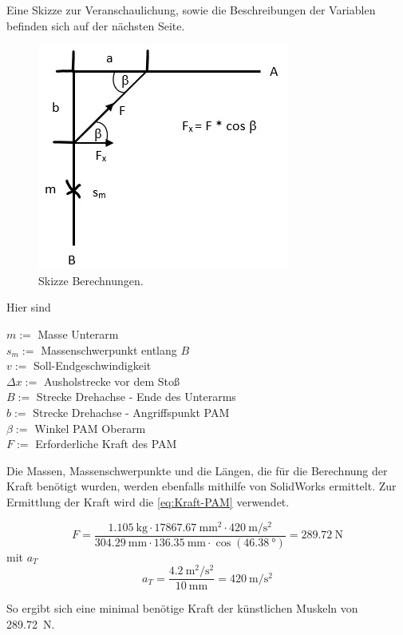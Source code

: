 		Eine Skizze zur Veranschaulichung, sowie die Beschreibungen der Variablen befinden sich auf der nächsten Seite. 

		\newpage
		\begin{figure}[h]
			\centering
			\includegraphics[width=.5\textwidth]{Abb/SkizzeBerechnungen.jpeg}
			\caption{Skizze Berechnungen.}%
			\label{fig:SkizzeBerechnungen}
		\end{figure}

		Hier sind

		\( m := \) Masse Unterarm \\
		\( s_m := \) Massenschwerpunkt entlang $ B $ \\
		\( v := \) Soll-Endgeschwindigkeit \\
		\( \Delta x := \) Ausholstrecke vor dem Stoß \\
		\( B := \) Strecke Drehachse - Ende des Unterarms \\
		\( b:= \) Strecke Drehachse - Angriffspunkt PAM \\
		\( \beta := \) Winkel PAM  Oberarm \\
		\( F:= \) Erforderliche Kraft des PAM

		Die Massen, Massenschwerpunkte und die Längen, die für die Berechnung der Kraft benötigt wurden, werden ebenfalls mithilfe von SolidWorks ermittelt. 
		Zur Ermittlung der Kraft wird die \cref{eq:Kraft-PAM} verwendet. 

		\begin{equation}
			F =\frac{\SI{1,105}{\kilogram} \cdot \SI{17867,67}{\milli\metre\squared} \cdot \SI{420}{\metre\per\second\squared}}{\SI{304,29}{\milli\metre} \cdot \SI{136,35}{\milli\metre} \cdot \cos{\left(\SI{46,38}{\degree}\right)}} = \SI{289,72}{\newton}
		\end{equation}
		mit \(a_T\)
		\begin{equation}
			a_T = \frac{\SI{4,2}{\metre\squared\per\second\squared}}{\SI{10}{\milli\metre}} = \SI{420}{\metre\per\second\squared}
		\end{equation}
		
		So ergibt sich eine minimal benötige Kraft der künstlichen Muskeln von \SI{289,72}{\newton}.
